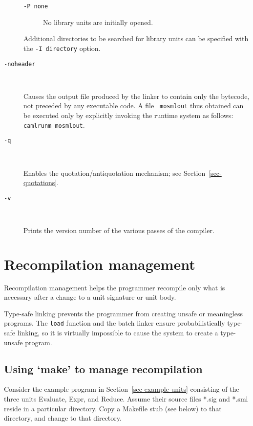\documentclass[fleqn]{article}
\begin{document}
\begin{description}
\begin{description}
  \item[{\tt -P none}] No library units are initially opened.
  \end{description}
  
  Additional directories to be searched for library units can be
  specified with the {\tt -I {\rm directory}} option.

\item[{\tt -noheader}]\mbox{ }

  Causes the output file produced by the linker to contain only the
  bytecode, not preceded by any executable code.  A file {\tt
    mosmlout} thus obtained can be executed only by explicitly
  invoking the runtime system as follows: {\tt camlrunm mosmlout}.

\item[{\tt -q}]\mbox{ }

  Enables the quotation/antiquotation mechanism; see
  Section~\ref{sec-quotations}.

\item[{\tt -v}]\mbox{ }

 Prints the version number of the various passes of the
  compiler.
\end{description}


\section{Recompilation management}
\label{sec-recompilation-guide}

Recompilation management helps the programmer recompile only what is
necessary after a change to a unit signature or unit body.  

Type-safe linking prevents the programmer from creating unsafe or
meaningless programs.  The {\tt load} function and the batch linker
ensure probabilistically type-safe linking, so it is virtually
impossible to cause the system to create a type-unsafe program.  


\subsection{Using `make' to manage recompilation}
\label{sec-using-make}

Consider the example program in Section~\ref{sec-example-units}
consisting of the three units Evaluate, Expr, and Reduce.  Assume
their source files *.sig and *.sml reside in a particular directory.
Copy a Makefile stub (see below) to that directory, and change to that
directory.
\end{document}

